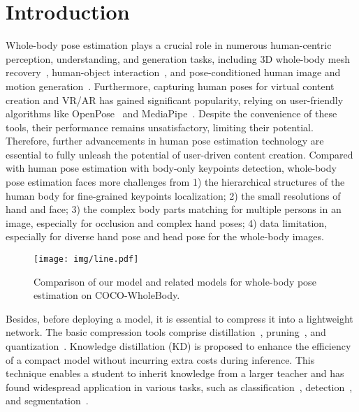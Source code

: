 \documentclass[10pt,twocolumn,letterpaper]{article}
\begin{document}
\section{Introduction}

Whole-body pose estimation plays a crucial role in numerous human-centric perception, understanding, and generation tasks, including 3D whole-body mesh recovery~\cite{black2023bedlam,lin2023one,GyeongsikMoon2020hand4whole,zheng2023avatarrex}, human-object interaction~\cite{fan2023arctic,taheri2020grab}, and pose-conditioned human image and motion generation~\cite{forte2023reconstructing,lin2023motion,liu2022beat,yi2023generating}. Furthermore, capturing human poses for virtual content creation and VR/AR has gained significant popularity, relying on user-friendly algorithms like OpenPose~\cite{cao2021openpose} and MediaPipe~\cite{lugaresi2019mediapipe,zhang2020mediapipe}. Despite the convenience of these tools, their performance remains unsatisfactory, limiting their potential. Therefore, further advancements in human pose estimation technology are essential to fully unleash the potential of user-driven content creation.
Compared with human pose estimation with body-only keypoints detection, whole-body pose estimation faces more challenges from 1) the hierarchical structures of the human body for fine-grained keypoints localization; 2) the small resolutions of hand and face; 3) the complex body parts matching for multiple persons in an image, especially for occlusion and complex hand poses; 4) data limitation, especially for diverse hand pose and head pose for the whole-body images.


\begin{figure}[t]
    \centering
    \texttt{[image: img/line.pdf]}
    \caption{Comparison of our model and related models for whole-body pose estimation on COCO-WholeBody.}
    \label{fig:comparison}
\end{figure}

Besides, before deploying a model, it is essential to compress it into a lightweight network. The basic compression tools comprise distillation~\cite{hinton2015distilling}, pruning~\cite{fang2023depgraph}, and quantization~\cite{yu2023boost}. Knowledge distillation (KD) is proposed to enhance the efficiency of a compact model without incurring extra costs during inference. This technique enables a student to inherit knowledge from a larger teacher and has found widespread application in various tasks, such as classification~\cite{zong2022better}, detection~\cite{xu2022damo}, and segmentation~\cite{liu2022transkd}. 
\end{document}
